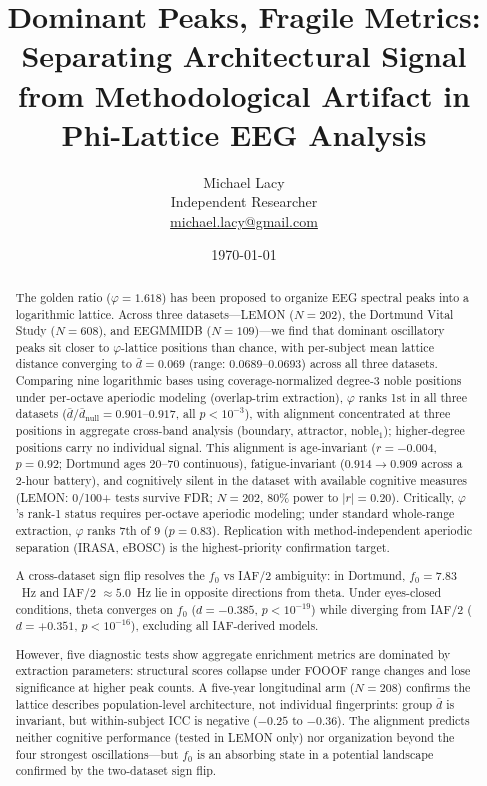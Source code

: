 \documentclass[11pt,a4paper]{article}
\title{Dominant Peaks, Fragile Metrics: Separating Architectural Signal from Methodological Artifact in Phi-Lattice EEG Analysis}
\author{Michael Lacy\\
\small Independent Researcher\\
\small \href{mailto:michael.lacy@gmail.com}{michael.lacy@gmail.com}}
\date{\today}
\newcommand{\phisym}{\varphi}
\newcommand{\fzero}{f_0}
\begin{document}
\maketitle

\begin{abstract}

The golden ratio ($\phisym = 1.618$) has been proposed to organize EEG spectral peaks into a logarithmic lattice. Across three datasets---LEMON ($N = 202$), the Dortmund Vital Study ($N = 608$), and EEGMMIDB ($N = 109$)---we find that dominant oscillatory peaks sit closer to $\phisym$-lattice positions than chance, with per-subject mean lattice distance converging to $\bar{d} = 0.069$ (range: 0.0689--0.0693) across all three datasets. Comparing nine logarithmic bases using coverage-normalized degree-3 noble positions under per-octave aperiodic modeling (overlap-trim extraction), $\phisym$ ranks 1st in all three datasets ($\bar{d}/\bar{d}_{\text{null}} = 0.901$--$0.917$, all $p < 10^{-3}$), with alignment concentrated at three positions in aggregate cross-band analysis (boundary, attractor, noble$_1$); higher-degree positions carry no individual signal. This alignment is age-invariant ($r = -0.004$, $p = 0.92$; Dortmund ages 20--70 continuous), fatigue-invariant ($0.914 \to 0.909$ across a 2-hour battery), and cognitively silent in the dataset with available cognitive measures (LEMON: 0/100+ tests survive FDR; $N = 202$, 80\% power to $|r| = 0.20$). Critically, $\phisym$'s rank-1 status requires per-octave aperiodic modeling; under standard whole-range extraction, $\phisym$ ranks 7th of 9 ($p = 0.83$). Replication with method-independent aperiodic separation (IRASA, eBOSC) is the highest-priority confirmation target.

A cross-dataset sign flip resolves the $\fzero$ vs IAF/2 ambiguity: in Dortmund, $\fzero = 7.83$~Hz and IAF/2 $\approx 5.0$~Hz lie in opposite directions from theta. Under eyes-closed conditions, theta converges on $\fzero$ ($d = -0.385$, $p < 10^{-19}$) while diverging from IAF/2 ($d = +0.351$, $p < 10^{-16}$), excluding all IAF-derived models.

However, five diagnostic tests show aggregate enrichment metrics are dominated by extraction parameters: structural scores collapse under FOOOF range changes and lose significance at higher peak counts. A five-year longitudinal arm ($N = 208$) confirms the lattice describes population-level architecture, not individual fingerprints: group $\bar{d}$ is invariant, but within-subject ICC is negative ($-0.25$ to $-0.36$). The alignment predicts neither cognitive performance (tested in LEMON only) nor organization beyond the four strongest oscillations---but $\fzero$ is an absorbing state in a potential landscape confirmed by the two-dataset sign flip.

\end{abstract}
\end{document}
